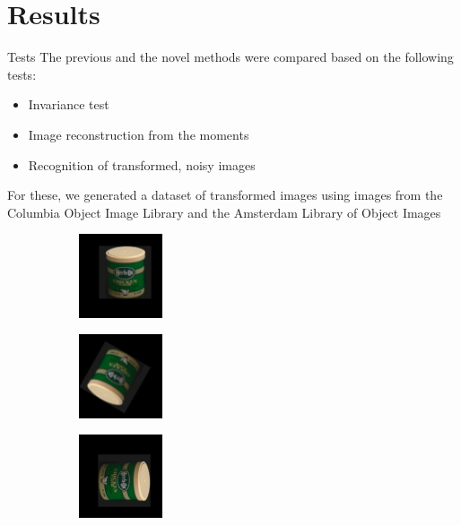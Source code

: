 \documentclass{beamer}
\begin{document}
\section{Results}
\begin{frame}{Tests}
    \vskip 5mm
    The previous and the novel methods were compared based on the following tests:
    \begin{itemize}
    \item Invariance test
    \item Image reconstruction from the moments
    \item Recognition of transformed, noisy images
    \end{itemize}
    For these, we generated a dataset of transformed images using images from the Columbia Object Image Library and the Amsterdam Library of Object Images
    \begin{figure}[tbp]
        \begin{subfigure}{0.3\textwidth}
            \centering
        \includegraphics[width=70pt]{figures/coil_rst/26x-11y9r0s1_0.png}
        \end{subfigure}
        \begin{subfigure}{0.3\textwidth}
            \centering
        \includegraphics[width=70pt]{figures/coil_rst/26x-11y9r150s0_5.png}
        \end{subfigure}
        \begin{subfigure}{0.3\textwidth}
            \centering
        \includegraphics[width=70pt]{figures/coil_rst/26x-11y9r270s1_75.png}
        \end{subfigure}
    \end{figure}
\end{frame}
\end{document}
